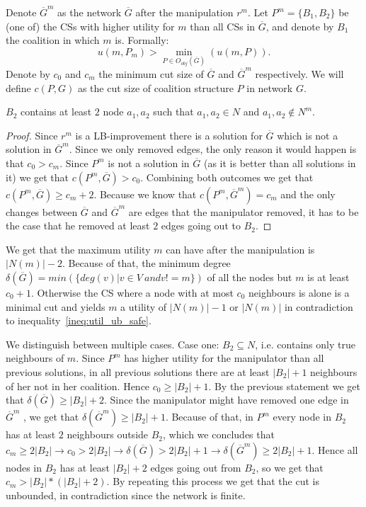 Denote $\overline{G}^m$ as the network $\overline{G}$ after the manipulation $r^m$. Let $P^m=\{B_1,B_2\}$ be (one of) the CSs with higher utility for $m$ than all CSs in $\overline{G}$, and denote by $B_1$ the coalition in which $m$ is. Formally:
\begin{equation}
\label{ineq:util_ub_safe}
u(m,P_m) > \underset{P\in O_{obj}(\overline{G})}{\min}(u(m,P)).    
\end{equation}
Denote by $c_0$ and $c_m$ the minimum cut size of $\overline{G}$ and $\overline{G}^m$ respectively.
We will define $c(P,G)$ as the cut size of coalition structure $P$ in network $G$.


\begin{lemma}
$B_2$ contains at least $2$ node $a_1,a_2$ such that $a_1,a_2\in N$ and $a_1,a_2\notin N^m$.
\end{lemma}
\begin{proof}
Since $r^m$ is a LB-improvement there is a solution for $\overline{G}$ which is not a solution in $\overline{G}^m$. Since we only removed edges, the only reason it would happen is that $c_0 > c_m$.
Since $P^m$ is not a solution in $\overline{G}$ (as it is better than all solutions in it) we get that $c(P^m,\overline{G}) > c_0$. Combining both outcomes we get that $c(P^m,\overline{G}) \geq c_m+2$. Because we know that $c(P^m,\overline{G}^m) = c_m$ and the only changes between $\overline{G}$ and $\overline{G}^m$ are edges that the manipulator removed, it has to be the case that he removed at least $2$ edges going out to $B_2$.
\end{proof}
We get that the maximum utility $m$ can have after the manipulation is $|N(m)|-2$. Because of that, the minimum degree $\delta(\overline{G}) = min(\{deg(v) | v\in V\ and v != m \})$ of all the nodes but $m$ is at least $c_0+1$. Otherwise the CS where a node with at most $c_0$ neighbours is alone is a minimal cut and yields $m$ a utility of $|N(m)|-1$ or $|N(m)|$ in contradiction to inequality~\ref{ineq:util_ub_safe}.

We distinguish between multiple cases. 
Case one: $B_2\subseteq N$, i.e. contains only true neighbours of $m$.
Since $P^m$ has higher utility for the manipulator than all previous solutions, in all previous solutions there are at least $|B_2|+1$ neighbours of her not in her coalition. Hence $c_0 \geq |B_2|+1$. By the previous statement we get that $\delta(\overline{G}) \geq |B_2| + 2$. Since the manipulator might have removed one edge in $\overline{G}^m$ , we get that $\delta(\overline{G}^m) \geq |B_2| + 1$. Because of that, in $P^m$ every node in $B_2$ has at least $2$ neighbours outside $B_2$, which we concludes that $c_m \geq 2|B_2| \rightarrow c_0 > 2|B_2| \rightarrow \delta(\overline{G}) > 2|B_2| + 1 \rightarrow \delta(\overline{G}^m) \geq 2|B_2|+1$. Hence all nodes in $B_2$ has at least $|B_2|+2$ edges going out from $B_2$, so we get that $c_m > |B_2|*(|B_2|+2)$. By repeating this process we get that the cut is unbounded, in contradiction since the network is finite.

